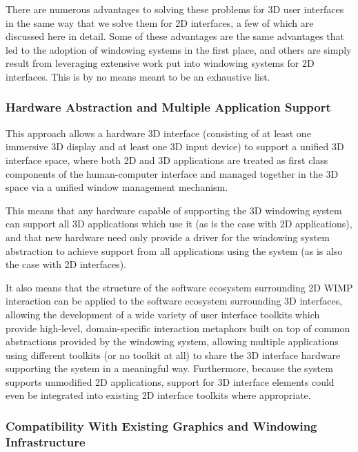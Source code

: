 There are numerous advantages to solving these problems for 3D user interfaces in the same way that we solve them for 2D interfaces, a few of which are discussed here in detail. Some of these advantages are the same advantages that led to the adoption of windowing systems in the first place, and others are simply result from leveraging extensive work put into windowing systems for 2D interfaces. This is by no means meant to be an exhaustive list.

\subsubsection{Hardware Abstraction and Multiple Application Support}

This approach allows a hardware 3D interface (consisting of at least one immersive 3D display and at least one 3D input device) to support a unified 3D interface space, where both 2D and 3D applications are treated as first class components of the human-computer interface and managed together in the 3D space via a unified window management mechanism. 

This means that any hardware capable of supporting the 3D windowing system can support all 3D applications which use it (as is the case with 2D applications), and that new hardware need only provide a driver for the windowing system abstraction to achieve support from all applications using the system (as is also the case with 2D interfaces). 

It also means that the structure of the software ecosystem surrounding 2D WIMP interaction can be applied to the software ecosystem surrounding 3D interfaces, allowing the development of a wide variety of user interface toolkits which provide high-level, domain-specific interaction metaphors built on top of common abstractions provided by the windowing system, allowing multiple applications using different toolkits (or no toolkit at all) to share the 3D interface hardware supporting the system in a meaningful way. Furthermore, because the system supports unmodified 2D applications, support for 3D interface elements could even be integrated into existing 2D interface toolkits where appropriate.

\subsubsection{Compatibility With Existing Graphics and Windowing Infrastructure}

